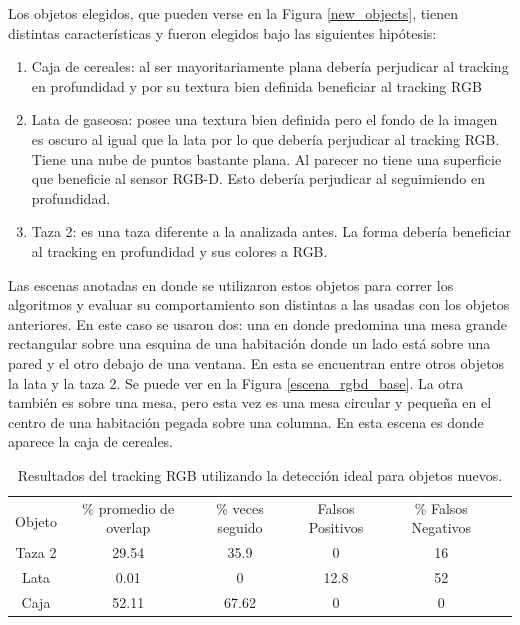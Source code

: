 Los objetos elegidos, que pueden verse en la Figura \ref{new_objects}, tienen distintas características y fueron elegidos bajo las siguientes hipótesis:
\begin{enumerate}
	\item Caja de cereales: al ser mayoritariamente plana debería perjudicar al tracking en profundidad y por su textura bien definida beneficiar al tracking RGB
	\item Lata de gaseosa: posee una textura bien definida pero el fondo de la imagen es oscuro al igual que la lata por lo que debería perjudicar al tracking RGB. Tiene una nube de puntos bastante plana. Al parecer no tiene una superficie que beneficie al sensor RGB-D. Esto debería perjudicar al seguimiendo en profundidad.
	\item Taza 2: es una taza diferente a la analizada antes. La forma debería beneficiar al tracking en profundidad y sus colores a RGB.
\end{enumerate}

Las escenas anotadas en donde se utilizaron estos objetos para correr los algoritmos y evaluar su comportamiento son distintas a las usadas con los objetos anteriores. En este caso se usaron dos: una en donde predomina una mesa grande rectangular sobre una esquina de una habitación donde un lado está sobre una pared y el otro debajo de una ventana. En esta se encuentran entre otros objetos la lata y la taza 2. Se puede ver en la Figura \ref{escena_rgbd_base}. La otra también es sobre una mesa, pero esta vez es una mesa circular y pequeña en el centro de una habitación pegada sobre una columna. En esta escena es donde aparece la caja de cereales.


\begin{table}[h]
	\centering
    \begin{tabular}{|c|c|c|c|c|c|}
    \hline
    & \multirow{2}{2.4cm}{\% promedio de overlap} & \multirow{2}{2cm}{\% veces seguido} & \multirow{2}{1.6cm}{Falsos Positivos} & \multirow{2}{1.6cm}{\% Falsos Negativos}\\
	Objeto & & & &\\
    \hline
    Taza 2  & 29.54      &  35.9     & 0        &  16 \\
    \hline
    Lata    &  0.01      &     0     & 12.8     &  52 \\
    \hline
    Caja    & 52.11      & 67.62     & 0        &   0 \\
    \hline
    \end{tabular}
\caption{Resultados del tracking RGB utilizando la detección ideal para objetos nuevos.}
\label{tabla_rgb_nuevos}
\end{table}


